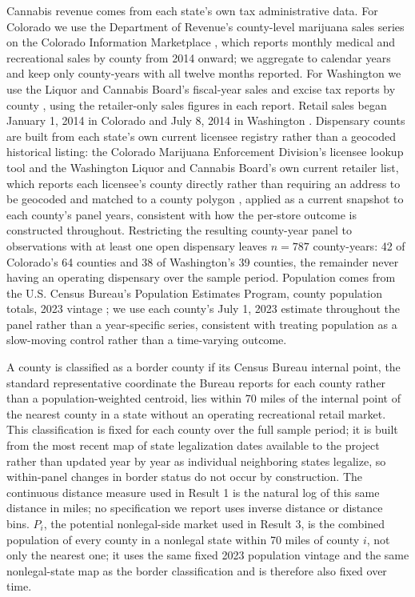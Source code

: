 \documentclass[12pt]{article}
\begin{document}
Cannabis revenue comes from each state's own tax administrative data. For Colorado we use the Department of
Revenue's county-level marijuana sales series on the Colorado Information Marketplace
\citep{COMarijuanaSalesByCounty}, which reports monthly medical and recreational sales by county from 2014
onward; we aggregate to calendar years and keep only county-years with all twelve months reported. For
Washington we use the Liquor and Cannabis Board's fiscal-year sales and excise tax reports by county
\citep{WALCBSalesByCounty}, using the retailer-only sales figures in each report. Retail sales began January
1, 2014 in Colorado \citep{COMedLicensees} and July 8, 2014 in Washington \citep{WSLCB2014FirstLicenses}.
Dispensary counts are built from each state's own current licensee registry rather than a geocoded historical
listing: the Colorado Marijuana Enforcement Division's licensee lookup tool \citep{COMedLicensees} and the
Washington Liquor and Cannabis Board's own current retailer list, which reports each licensee's county
directly rather than requiring an address to be geocoded and matched to a county polygon
\citep{WALCBLicenseeList,WALCBCannabisRetailers2026}, applied as a current snapshot to each county's panel
years, consistent with how the per-store outcome is constructed throughout. Restricting the resulting
county-year panel to observations with at least one open dispensary leaves $n=787$ county-years: 42 of
Colorado's 64 counties and 38 of Washington's 39 counties, the remainder never having an operating dispensary
over the sample period. Population comes from the U.S. Census Bureau's Population Estimates Program, county
population totals, 2023 vintage \citep{CensusPopEst2023}; we use each county's July 1, 2023 estimate
throughout the panel rather than a year-specific series, consistent with treating population as a
slow-moving control rather than a time-varying outcome.

A county is classified as a border county if its Census Bureau internal point, the standard representative
coordinate the Bureau reports for each county rather than a population-weighted centroid, lies within 70
miles of the internal point of the nearest county in a state without an operating recreational retail
market. This classification is fixed for each county over the full sample period; it is built from the most
recent map of state legalization dates available to the project rather than updated year by year as
individual neighboring states legalize, so within-panel changes in border status do not occur by
construction. The continuous distance measure used in Result 1 is the natural log of this same distance in
miles; no specification we report uses inverse distance or distance bins. $P_i$, the potential nonlegal-side
market used in Result 3, is the combined population of every county in a nonlegal state within 70 miles of
county $i$, not only the nearest one; it uses the same fixed 2023 population vintage and the same
nonlegal-state map as the border classification and is therefore also fixed over time.
\end{document}
